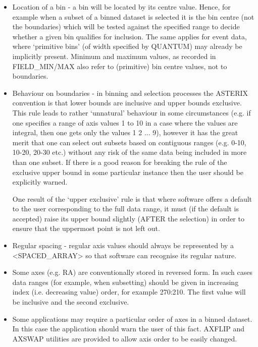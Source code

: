\begin{itemize}
\item
Location of a bin - a bin  will  be  located  by  its  centre
value.   Hence, for example when a subset of a binned dataset
is selected it is the bin centre (not the  boundaries)  which
will  be tested against the specified range to decide whether
a given bin qualifies for inclusion.  The  same  applies  for
event  data,  where  `primitive  bins' (of width specified by
QUANTUM) may already  be  implicitly  present.   Minimum  and
maximum  values,  as  recorded in FIELD\_MIN/MAX also refer to
(primitive) bin centre values, not to boundaries.

\item
Behaviour on boundaries - in binning and selection  processes
the ASTERIX convention is that lower bounds are inclusive and
upper  bounds  exclusive.   This   rule   leads   to   rather
`unnatural'  behaviour  in  some  circumstances (e.g.  if one
specifies a range of axis values 1 to 10 in a case where  the
values  are  integral,  then one gets only the values 1 2 ...
9), however it has the great merit that one  can  select  out
subsets  based on contiguous ranges (e.g.  0-10, 10-20, 20-30
etc.) without any risk of the same  data  being  included  in
more than one subset.  If there is a good reason for breaking
the rule of the exclusive  upper  bound  in  some  particular
instance then the user should be explicitly warned.

One result of  the  `upper  exclusive'  rule  is  that  where
software  offers  a  default to the user corresponding to the
full data range, it must (if the default is  accepted)  raise
its  upper  bound  slightly (AFTER the selection) in order to
ensure that the uppermost point is not left out.

\item
Regular spacing  -  regular  axis  values  should  always  be
represented   by   a  <SPACED\_ARRAY>  so  that  software  can
recognise its regular nature.

\item
Some axes (e.g.  RA) are conventionally  stored  in  reversed
form.    In   such  cases  data  ranges  (for  example,  when
subsetting)  should  be  given  in  increasing  index   (i.e.
decreasing  value)  order,  for  example  270:210.  The first
value will be inclusive and the second exclusive.

\item
Some applications may require a particular order of axes in a
binned dataset.  In this case the application should warn the
user of this fact.  AXFLIP and AXSWAP utilities are  provided
to allow axis order to be easily changed.


\end{itemize}
